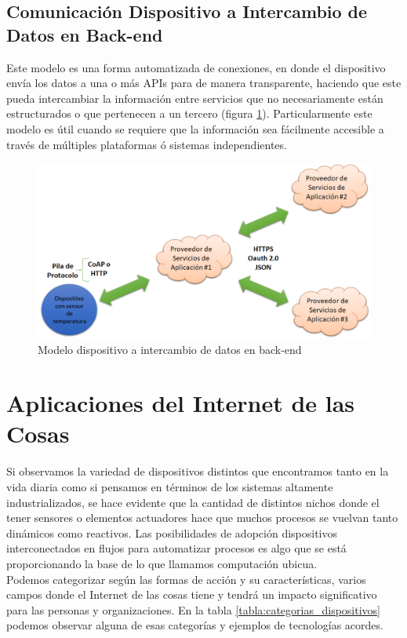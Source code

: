 \subsection{Comunicación Dispositivo a Intercambio de Datos en Back-end}
Este modelo es una forma automatizada de conexiones, en donde el dispositivo envía los datos a una o más APIs para de manera transparente, haciendo que este pueda intercambiar la información entre servicios que no necesariamente están estructurados o que pertenecen a un tercero (figura \ref{fig:d2b}). Particularmente este modelo es útil cuando se requiere que la información sea fácilmente accesible a través de múltiples plataformas ó sistemas independientes.
\begin{figure}[htb]
\centering
\includegraphics[scale=0.425]{./Figuras/d2b.png}
\caption{Modelo dispositivo a intercambio de datos en back-end}
\label{fig:d2b}
\vspace*{-10pt}
\end{figure}

\section{Aplicaciones del Internet de las Cosas}
Si observamos la variedad de dispositivos distintos que encontramos tanto en la vida diaria como si pensamos en términos de los sistemas altamente industrializados, se hace evidente que la cantidad de distintos nichos donde el tener sensores o elementos actuadores hace que muchos procesos se vuelvan tanto dinámicos como reactivos. Las posibilidades de adopción dispositivos interconectados en flujos para automatizar procesos es algo que se está proporcionando la base de lo que llamamos computación ubicua.\\

Podemos categorizar según las formas de acción y su características, varios campos donde el Internet de las cosas tiene y tendrá un impacto significativo para las personas y organizaciones. En la tabla \ref{tabla:categorias_dispositivos} podemos observar alguna de esas categorías y ejemplos de tecnologías acordes\cite{tablaiot}.

